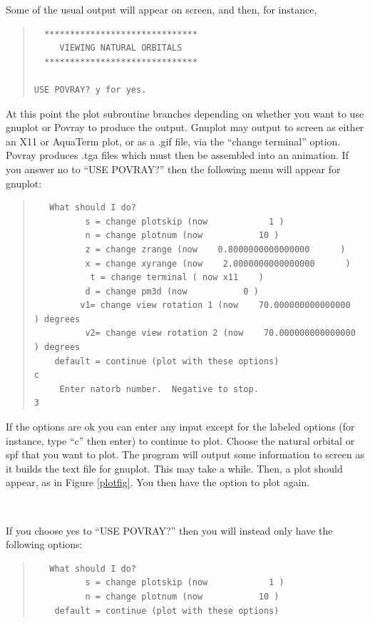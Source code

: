 \documentclass[10pt,leqno, oneside]{book}
\begin{document}
Some of the usual output will appear on screen, and then, for instance,
{\small\begin{quote}
\begin{verbatim}
  ****************************** 
     VIEWING NATURAL ORBITALS    
  ****************************** 

USE POVRAY? y for yes.
\end{verbatim}  
\end{quote}}
At this point the plot subroutine branches depending on whether you want to use gnuplot or Povray to produce the output.  Gnuplot may output to screen as either an X11 or AquaTerm plot, or as a .gif file, via the ``change terminal'' option.  Povray produces .tga files which must then be assembled into an animation.  If you answer no to ``USE POVRAY?'' then the following menu will appear for gnuplot:
{\small\begin{quote}
\begin{verbatim}
   What should I do?
          s = change plotskip (now            1 )
          n = change plotnum (now           10 )
          z = change zrange (now    0.8000000000000000      )
          x = change xyrange (now    2.0000000000000000      )
           t = change terminal ( now x11    )
          d = change pm3d (now           0 )
         v1= change view rotation 1 (now    70.000000000000000      ) degrees
          v2= change view rotation 2 (now    70.000000000000000      ) degrees
    default = continue (plot with these options)
c
     Enter natorb number.  Negative to stop.
3
\end{verbatim}
\end{quote}}
If the options are ok you can enter any input except for the labeled options (for instance, type ``c'' then enter) to continue to plot.  Choose the natural orbital or spf that you want to plot.  The program will output some information to screen as it builds the text file for gnuplot.  This may take a while.  Then, a plot should appear, as in Figure \ref{plotfig}.  You then have the option to plot again.

\

If you choose yes to ``USE POVRAY?'' then you will instead only have the following options:
{\small\begin{quote}
\begin{verbatim}
   What should I do?
          s = change plotskip (now            1 )
          n = change plotnum (now           10 )
    default = continue (plot with these options)
\end{verbatim}
\end{quote}}
\end{document}
